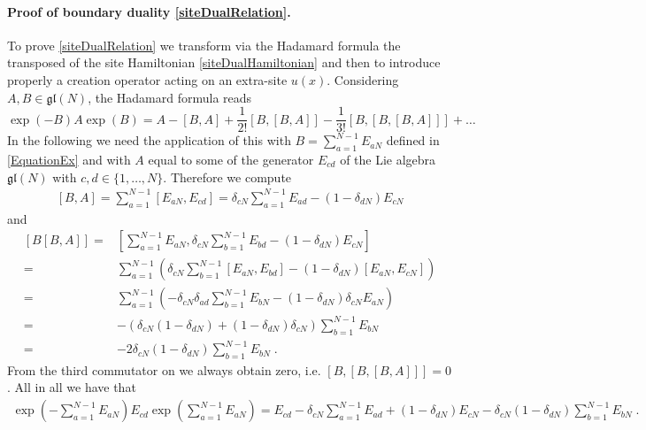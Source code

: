 \documentclass[10pt]{article}
\numberwithin{equation}{section}
\numberwithin{equation}{subsection}
\newcommand{\dt}{\;.}
\begin{document}
 \paragraph{Proof of boundary duality \eqref{siteDualRelation}.} To prove \eqref{siteDualRelation} we transform via the Hadamard formula the transposed of the site Hamiltonian \eqref{siteDualHamiltonian} and then to  introduce properly a creation operator acting on an extra-site $u(x)$. %
 Considering $A,B\in \mathfrak{gl}(N)$, the Hadamard formula reads 
 \begin{equation}\label{HadamardFormula}
     \exp{(-B)}A\exp{(B)}=A-\left[B,A\right]+\frac{1}{2!}\left[B,\left[B,A\right]\right]-\frac{1}{3!}\left[B,\left[B,\left[B,A\right]\right]\right]+\ldots
 \end{equation}
In the following we need the application of this with $B=\sum_{a=1}^{N-1}E_{aN}$ defined in \eqref{EquationEx} and with $A$ equal to some of the generator $E_{cd}$ of the Lie algebra $\mathfrak{gl}(N)$ with $c,d\in\{1,\ldots,N\}$. Therefore we compute 
\begin{align}
	\left[B,A\right]=\sum_{a=1}^{N-1}\left[E_{aN},E_{cd}\right]=\delta_{cN}\sum_{a=1}^{N-1}E_{ad}-(1-\delta_{dN})E_{cN}
\end{align}
and 
\begin{align}
	\left[B\left[B,A\right]\right]=&\left[\sum_{a=1}^{N-1}E_{aN},\delta_{cN}\sum_{b=1}^{N-1}E_{bd}-(1-\delta_{dN})E_{cN}\right]\nonumber\\=&
	\sum_{a=1}^{N-1}\left(\delta_{cN}\sum_{b=1}^{N-1}\left[E_{aN},E_{bd}\right]-(1-\delta_{dN})\left[E_{aN},E_{cN}\right]\right)\nonumber\\=&
	\sum_{a=1}^{N-1}\left(-\delta_{cN}\delta_{ad}\sum_{b=1}^{N-1}E_{bN}-(1-\delta_{dN})\delta_{cN}E_{aN}\right)\nonumber\\=&
	-\left(\delta_{cN}(1-\delta_{dN})+(1-\delta_{dN})\delta_{cN}\right)\sum_{b=1}^{N-1}E_{bN}\nonumber
	\\=&
	-2\delta_{cN}(1-\delta_{dN})\sum_{b=1}^{N-1}E_{bN}\dt
\end{align}
From the third commutator on we always obtain zero, i.e. $[B,[B,[B,A]]]=0$. All in all we have that 
 \begin{align}\label{HT-BA}
 	\exp{\left(-\sum_{a=1}^{N-1}E_{aN}\right)}E_{cd}\exp{\left(\sum_{a=1}^{N-1}E_{aN}\right)}=E_{cd}-\delta_{cN}\sum_{a=1}^{N-1}E_{ad}+(1-\delta_{dN})E_{cN}-\delta_{cN}(1-\delta_{dN})\sum_{b=1}^{N-1}E_{bN}\dt
 \end{align}
\end{document}
